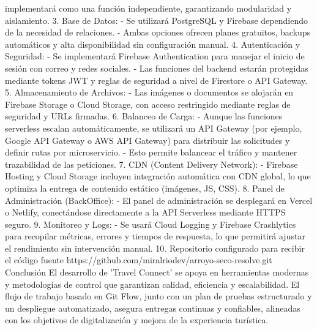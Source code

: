 implementará como una función independiente, garantizando
modularidad y aislamiento.
3. Base de Datos:
- Se utilizará PostgreSQL y Firebase dependiendo de la necesidad de
relaciones.
- Ambas opciones ofrecen planes gratuitos, backups automáticos y
alta disponibilidad sin configuración manual.
4. Autenticación y Seguridad:
- Se implementará Firebase Authentication para manejar el inicio de
sesión con correo y redes sociales.
- Las funciones del backend estarán protegidas mediante tokens
JWT y reglas de seguridad a nivel de Firestore o API Gateway.
5. Almacenamiento de Archivos:
- Las imágenes o documentos se alojarán en Firebase Storage o
Cloud Storage, con acceso restringido mediante reglas de seguridad
y URLs firmadas.
6. Balanceo de Carga:
- Aunque las funciones serverless escalan automáticamente, se
utilizará un API Gateway (por ejemplo, Google API Gateway o AWS
API Gateway) para distribuir las solicitudes y definir rutas por
microservicio.
- Esto permite balancear el tráfico y mantener trazabilidad de las
peticiones.
7. CDN (Content Delivery Network):
- Firebase Hosting y Cloud Storage incluyen integración automática
con CDN global, lo que optimiza la entrega de contenido estático
(imágenes, JS, CSS).
8. Panel de Administración (BackOffice):
- El panel de administración se desplegará en Vercel o Netlify,
conectándose directamente a la API Serverless mediante HTTPS
seguro.
9. Monitoreo y Logs:
- Se usará Cloud Logging y Firebase Crashlytics para recopilar
métricas, errores y tiempos de respuesta, lo que permitirá ajustar el
rendimiento sin intervención manual.
10. Repositorio configurado para recibir el código fuente
https://github.com/miralriodev/arroyo-seco-resolve.git
Conclusión
El desarrollo de 'Travel Connect' se apoya en herramientas modernas y
metodologías de control que garantizan calidad, eficiencia y escalabilidad.
El flujo de trabajo basado en Git Flow, junto con un plan de pruebas
estructurado y un despliegue automatizado, asegura entregas continuas y
confiables, alineadas con los objetivos de digitalización y mejora de la
experiencia turística.
